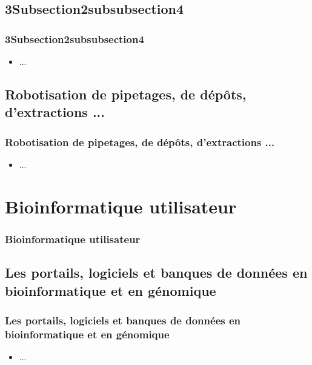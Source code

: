 \documentclass{beamer}
\begin{document}
\subsection{ \titleSection3Subsection2subsubsection4 }
\begin{frame}
	\frametitle{ \titleSection3Subsection2subsubsection4 }
	\begin{itemize}
		\item ... 
	\end{itemize}
\end{frame}



\def\titleSection3Subsection3{Robotisation de pipetages, de d{\'e}p{\^o}ts, d'extractions ...}
\subsection{ \titleSection3Subsection3 }
\begin{frame}
	\frametitle{ \titleSection3Subsection3 }
	\begin{itemize}
		\item ... 
	\end{itemize}
\end{frame}


\def\titleSection4{Bioinformatique utilisateur }
\section{ \titleSection4 }
\begin{frame}
	\frametitle{ \titleSection4 }
	\tableofcontents[sections=5,currentsection,subsectionstyle=show/shaded/hide]
\end{frame} 

\def\titleSection4SubsectionI{Les portails, logiciels et banques de donn{\'e}es en bioinformatique et en g{\'e}nomique}
\subsection{ \titleSection4SubsectionI }
\begin{frame}
	\frametitle{ \titleSection4SubsectionI }
	\begin{itemize}
		\item ... 
	\end{itemize}
\end{frame}

\def\titleSection4Subsection2{Comparaison d'une s{\'e}quence nucl{\'e}ique ou prot{\'e}ique avec une banque de s{\'e}quences}
\end{document}
